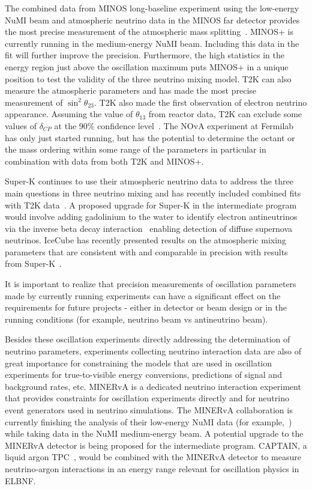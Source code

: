 The combined data from MINOS long-baseline experiment using the
low-energy NuMI beam and atmospheric neutrino data in the MINOS far
detector provides the most precise measurement of the atmospheric mass
splitting~\cite{Adamson:2014vgd}.  MINOS+ is currently running in the
medium-energy NuMI beam.  Including this data in the fit will further
improve the precision.  Furthermore, the high statistics in the energy
region just above the oscillation maximum puts MINOS+ in a unique
position to test the validity of the three neutrino mixing model. T2K
can also measure the atmospheric parameters and has made the most
precise measurement of $\sin^2\theta_{23}$.  T2K also made the first
observation of electron neutrino appearance.  Assuming the value of
$\theta_{13}$ from reactor data, T2K can exclude some values of
$\delta_{CP}$ at the 90\% confidence level~\cite{Abe:2015awa}.  The
NOvA experiment at Fermilab has only just started running, but has the
potential to determine the octant or the mass ordering within some
range of the parameters in particular in combination with data from
both T2K and MINOS+.

Super-K continues to use their atmospheric neutrino data to address
the three main questions in three neutrino mixing and has recently
included combined fits with T2K data~\cite{Wendell:2014dka}.  A
proposed upgrade for Super-K in the intermediate program would involve
adding gadolinium to the water to identify electron antineutrinos via
the inverse beta decay interaction~\cite{Beacom:2003nk} enabling
detection of diffuse supernova neutrinos. IceCube has recently
presented results on the atmospheric mixing parameters that are
consistent with and comparable in precision with results from
Super-K~\cite{Aartsen:2014yll}.

It is important to realize that precision measurements of oscillation
parameters made by currently running experiments can have a
significant effect on the requirements for future projects - either in
detector or beam design or in the running conditions (for example,
neutrino beam vs antineutrino beam).

Besides these oscillation experiments directly addressing the
determination of neutrino parameters, experiments collecting neutrino
interaction data are also of great importance for constraining the models
that are used in oscillation experiments for true-to-visible energy
conversions, predictions of signal and background rates, etc.  MINERvA
is a dedicated neutrino interaction experiment that provides
constraints for oscillation experiments directly and for neutrino
event generators used in neutrino simulations.  The MINERvA
collaboration is currently finishing the analysis of their low-energy
NuMI data (for example,~\cite{Walton:2014esl}) while taking data in
the NuMI medium-energy beam.  A potential upgrade to the MINERvA
detector is being proposed for the intermediate program.  CAPTAIN, a
liquid argon TPC~\cite{Berns:2013usa}, would be combined with the
MINERvA detector to measure neutrino-argon interactions in an energy
range relevant for oscillation physics in ELBNF.

